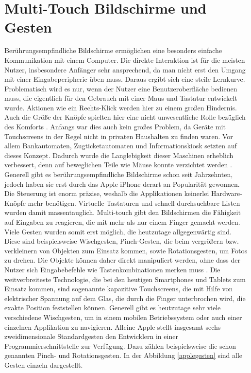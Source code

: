 \documentclass[11pt,a4paper]{report}
\begin{document}
\section{Multi-Touch Bildschirme und Gesten}

Berührungsempfindliche Bildschirme ermöglichen eine besonders einfache Kommunikation mit einem Computer. Die direkte Interaktion ist für die meisten Nutzer, insbesondere Anfänger sehr ansprechend, da man nicht erst den Umgang mit einer Eingabeperipherie üben muss. Daraus ergibt sich eine steile Lernkurve. Problematisch wird es nur, wenn der Nutzer eine Benutzeroberfläche bedienen muss, die eigentlich für den Gebrauch mit einer Maus und Tastatur entwickelt wurde. Aktionen wie ein Rechts-Klick werden hier zu einem großen Hindernis. Auch die Größe der Knöpfe spielten hier eine nicht unwesentliche Rolle bezüglich des Komforts \cite{benko2006precise}. Anfangs war dies auch kein großes Problem, da Geräte mit Touchscreens in der Regel nicht in privaten Haushalten zu finden waren. Vor allem Bankautomaten, Zugticketautomaten und Informationskiosk setzten auf dieses Konzept. Dadurch wurde die Langlebigkeit dieser Maschinen erheblich verbessert, denn auf beweglichen Teile wie Mäuse konnte verzichtet werden \cite{albinsson2003high}. Generell gibt es berührungsempfindliche Bildschirme schon seit Jahrzehnten, jedoch haben sie erst durch das Apple iPhone derart an Popularität gewonnen. Die Steuerung ist enorm präzise, weshalb die Applikationen keinerlei Hardware-Knöpfe mehr benötigen. Virtuelle Tastaturen und schnell durchsuchbare Listen wurden damit massentauglich. Multi-touch gibt den Bildschirmen die Fähigkeit auf Eingaben zu reagieren, die mit mehr als nur einem Finger gemacht werden. Viele Gesten wurden somit erst möglich, die heutzutage allgegenwärtig sind. Diese sind beispielsweise Wischgesten, Pinch-Gesten, die beim vergrößern bzw. verkleinern von Objekten zum Einsatz kommen, sowie Rotationsgesten, um Fotos zu drehen. Die Objekte können daher direkt manipuliert werden, ohne dass der Nutzer sich Eingabebefehle wie Tastenkombinationen merken muss \cite{kane2008slide}. Die weitverbreiteste Technologie, die bei den heutigen Smartphones und Tablets zum Einsatz kommen, sind sogenannte kapazitive Touchscreens, die mit Hilfe von elektrischer Spannung auf dem Glas, die durch die Finger unterbrochen wird, die exakte Position feststellen können. \cite{laufs2013aufbau} Generell gibt es heutzutage sehr viele verschiedene Wischgesten, um in einem mobilen Betriebssystem oder auch einer einzelnen Applikation zu navigieren. Alleine Apple stellt insgesamt sechs zweidimensionale Standardgesten den Entwicklern in einer Programmierschnittstelle zur Verfügung. Dazu zählen beispielsweise die schon genannten Pinch- und Rotationsgesten. In der Abbildung \ref{applegesten} sind alle Gesten einzeln dargestellt.\begin{figure}[h]

\end{figure}
\end{document}
